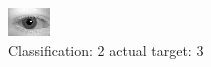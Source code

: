 \begin{figure}[h!]
\begin{center}
\includegraphics[width=0.60\columnwidth]{figures/ID575_class_2_target_3.png}
\end{center}
\caption{ Classification: 2 actual target: 3}
\label{fig:ID575_class_2_target_3}
\end{figure}
